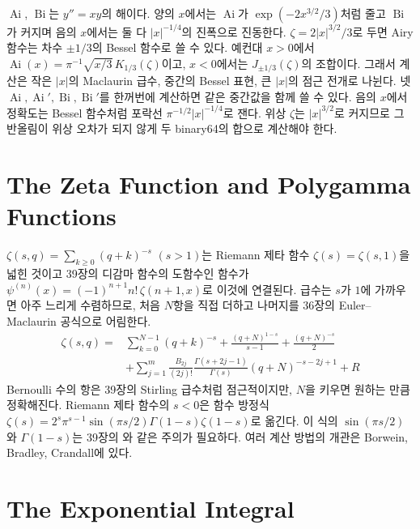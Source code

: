  $\operatorname{Ai}$, $\operatorname{Bi}$는 $y''=xy$의 해이다. 양의 $x$에서는 $\operatorname{Ai}$가 $\exp(-2x^{3/2}/3)$처럼 줄고 $\operatorname{Bi}$가 커지며 음의 $x$에서는 둘 다 $|x|^{-1/4}$의 진폭으로 진동한다. $\zeta=2|x|^{3/2}/3$로 두면 Airy 함수는 차수 $\pm1/3$의 Bessel 함수로 쓸 수 있다. 예컨대 $x>0$에서 $\operatorname{Ai}(x)=\pi^{-1}\sqrt{x/3}\,K_{1/3}(\zeta)$이고, $x<0$에서는 $J_{\pm1/3}(\zeta)$의 조합이다\cite{dlmf,vallee2004airy}. 그래서 계산은 작은 $|x|$의 Maclaurin 급수, 중간의 Bessel 표현, 큰 $|x|$의 점근 전개로 나뉜다. 넷 $\operatorname{Ai},\operatorname{Ai}',\operatorname{Bi},\operatorname{Bi}'$를 한꺼번에 계산하면 같은 중간값을 함께 쓸 수 있다. 음의 $x$에서 정확도는 Bessel 함수처럼 포락선 $\pi^{-1/2}|x|^{-1/4}$로 잰다. 위상 $\zeta$는 $|x|^{3/2}$로 커지므로 그 반올림이 위상 오차가 되지 않게 두 binary64의 합으로 계산해야 한다.

\section{The Zeta Function and Polygamma Functions}
\label{sec:zeta}

 $\zeta(s,q)=\sum_{k\ge0}(q+k)^{-s}$ $(s>1)$는 Riemann 제타 함수 $\zeta(s)=\zeta(s,1)$을 넓힌 것이고 39장의 디감마 함수의 도함수인  함수가 $\psi^{(n)}(x)=(-1)^{n+1}n!\,\zeta(n+1,x)$로 이것에 연결된다. 급수는 $s$가 $1$에 가까우면 아주 느리게 수렴하므로, 처음 $N$항을 직접 더하고 나머지를 36장의 Euler--Maclaurin 공식으로 어림한다.
\begin{align*}
\zeta(s,q)={}&\sum_{k=0}^{N-1}(q+k)^{-s}+\frac{(q+N)^{1-s}}{s-1}+\frac{(q+N)^{-s}}2\\
&+\sum_{j=1}^{m}\frac{B_{2j}}{(2j)!}\frac{\Gamma(s+2j-1)}{\Gamma(s)}(q+N)^{-s-2j+1}+R
\end{align*}
Bernoulli 수의 항은 39장의 Stirling 급수처럼 점근적이지만, $N$을 키우면 원하는 만큼 정확해진다. Riemann 제타 함수의 $s<0$은 함수 방정식 $\zeta(s)=2^s\pi^{s-1}\sin(\pi s/2)\Gamma(1-s)\zeta(1-s)$로 옮긴다. 이 식의 $\sin(\pi s/2)$와 $\Gamma(1-s)$는 39장의 와 같은 주의가 필요하다. 여러 계산 방법의 개관은 Borwein, Bradley, Crandall에 있다\cite{borwein2000zeta}.

\section{The Exponential Integral}
\label{sec:expint}

